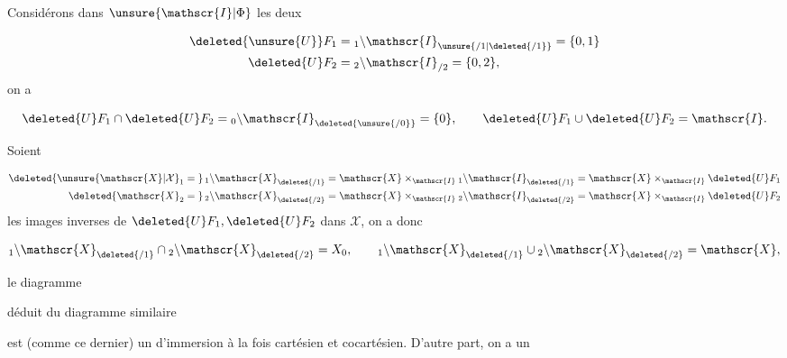 Considérons dans $\unsure{\mathscr{I}|\Phi}$ les deux  

\[
\begin{aligned}
\deleted{\unsure{U}}F_1&={}_1\backslash\mathscr{I}_{\unsure{/1|\deleted{/1}}}=\{0,1\}\\
\deleted{U}F_2&={}_2\backslash\mathscr{I}_{/2}=\{0,2\},
\end{aligned}
\]
on a

\[
\deleted{U}F_1\cap\deleted{U}F_2={}_0\backslash\mathscr{I}_{\deleted{\unsure{/0}}}=\{0\},\qquad
\deleted{U}F_1\cup\deleted{U}F_2=\mathscr{I}.
\]

Soient

\[
\begin{aligned}
\deleted{\unsure{\mathscr{X}|\mathcal X}_1={}}\,{}_1\backslash\mathscr{X}_{\deleted{/1}}&=\mathscr{X}\times_{\mathscr{I}}{}_1\backslash\mathscr{I}_{\deleted{/1}}=\mathscr{X}\times_{\mathscr{I}}\deleted{U}F_1\\
\deleted{\mathscr{X}_2={}}\,{}_2\backslash\mathscr{X}_{\deleted{/2}}&=\mathscr{X}\times_{\mathscr{I}}{}_2\backslash\mathscr{I}_{\deleted{/2}}=\mathscr{X}\times_{\mathscr{I}}\deleted{U}F_2
\end{aligned}
\]
les images inverses de $\deleted{U}F_1,\deleted{U}F_2$ dans $\mathscr{X}$, on a donc

\[
{}_1\backslash\mathscr{X}_{\deleted{/1}}\cap{}_2\backslash\mathscr{X}_{\deleted{/2}}=X_0,\qquad
{}_1\backslash\mathscr{X}_{\deleted{/1}}\cup{}_2\backslash\mathscr{X}_{\deleted{/2}}=\mathscr{X},
\]

 le diagramme

déduit du diagramme similaire 

est (comme ce dernier) un  d'immersion  à la fois cartésien et cocartésien. D'autre part, on a un 
